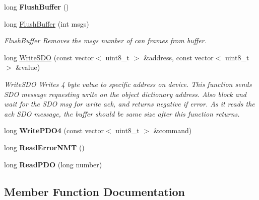 \begin{DoxyCompactItemize}
\mbox{\label{classCiA301CommPort_a067cddaf01932fa6fa27255c61b08190}} 
long {\bfseries Flush\+Buffer} ()
\item 
long \hyperlink{classCiA301CommPort_ab29e221039a2d21d1446edb09b91864e}{Flush\+Buffer} (int msgs)
\begin{DoxyCompactList}\small\item\em Flush\+Buffer Removes the msgs number of can frames from buffer. \end{DoxyCompactList}\item 
long \hyperlink{classCiA301CommPort_a4d97c27423b2323f8475f6e5c2f91575}{Write\+S\+DO} (const vector$<$ uint8\+\_\+t $>$ \&address, const vector$<$ uint8\+\_\+t $>$ \&value)
\begin{DoxyCompactList}\small\item\em Write\+S\+DO Writes 4 byte value to specific address on device. This function sends S\+DO message requesting write on the object dictionary address. Also block and wait for the S\+DO msg for write ack, and returns negative if error. As it reads the ack S\+DO message, the buffer should be same size after this function returns. \end{DoxyCompactList}\item 
\mbox{\label{classCiA301CommPort_a1faf4f37530e0dd0ae4600cfb0b1d742}} 
long {\bfseries Write\+P\+D\+O4} (const vector$<$ uint8\+\_\+t $>$ \&command)
\item 
\mbox{\label{classCiA301CommPort_a46534ff9e7e2a05a0b4913e4331710e5}} 
long {\bfseries Read\+Error\+N\+MT} ()
\item 
\mbox{\label{classCiA301CommPort_a827f3e594b9f1e57a7b7ccb8a278404a}} 
long {\bfseries Read\+P\+DO} (long number)
\end{DoxyCompactItemize}


\subsection{Member Function Documentation}
\mbox{\label{classCiA301CommPort_ab29e221039a2d21d1446edb09b91864e}} 

